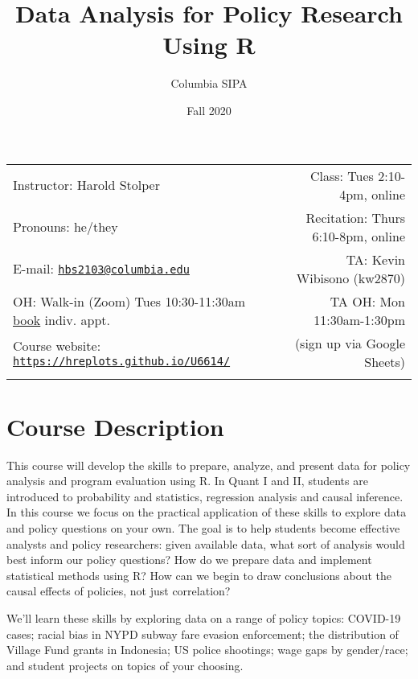 \documentclass[11pt,]{article}
\title{Data Analysis for Policy Research Using R}
\author{Columbia \textbar{} SIPA}
\date{Fall 2020}
\begin{document}
  

		\maketitle
		
	
		\thispagestyle{firststyle}



	\noindent \begin{tabular*}{\textwidth}{ @{\extracolsep{\fill}} lr @{\extracolsep{\fill}}}

Instructor: Harold Stolper & Class: Tues 2:10-4pm, online\\
Pronouns: he/they & Recitation: Thurs 6:10-8pm, online\\
E-mail: \texttt{\href{mailto:hbs2103@columbia.edu}{\nolinkurl{hbs2103@columbia.edu}}} & TA: Kevin
Wibisono (kw2870)\\
OH: Walk-in (Zoom) Tues 10:30-11:30am \textbar{}
\href{https://helloharold.youcanbook.me}{book} indiv.
appt.  &  TA OH: Mon 11:30am-1:30pm\\
Course website: \texttt{\url{https://hreplots.github.io/U6614/}} & (sign up via Google Sheets)\\
	&  \\
	\hline
	\end{tabular*}
	
\vspace{2mm}
	


\hypertarget{course-description}{%
\section{Course Description}\label{course-description}}

This course will develop the skills to prepare, analyze, and present
data for policy analysis and program evaluation using R. In Quant I and
II, students are introduced to probability and statistics, regression
analysis and causal inference. In this course we focus on the practical
application of these skills to explore data and policy questions on your
own. The goal is to help students become effective analysts and policy
researchers: given available data, what sort of analysis would best
inform our policy questions? How do we prepare data and implement
statistical methods using R? How can we begin to draw conclusions about
the causal effects of policies, not just correlation?

We'll learn these skills by exploring data on a range of policy topics:
COVID-19 cases; racial bias in NYPD subway fare evasion enforcement; the
distribution of Village Fund grants in Indonesia; US police shootings;
wage gaps by gender/race; and student projects on topics of your
choosing.
\end{document}
